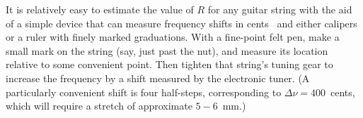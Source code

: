 It is relatively easy to estimate the value of $R$ for any guitar string with the aid of a simple device that can measure frequency shifts in cents~\cite{ref:pgtweb} and either calipers or a ruler with finely marked graduations. With a fine-point felt pen, make a small mark on the string (say, just past the nut), and measure its location relative to some convenient point. Then tighten that string's tuning gear to increase the frequency by a shift measured by the electronic tuner. (A particularly convenient shift is four half-steps, corresponding to $\Delta \nu = 400$~cents, which will require a stretch of approximate $5 - 6$~mm.) 

%
%
%
